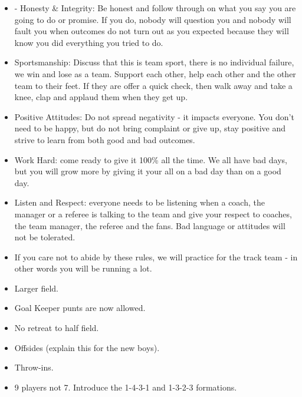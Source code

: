 \documentclass[10pt,letterpaper]{article}
\newenvironment{evenBlock}[1]{%
    \tcolorbox[beamer,%
    noparskip,breakable,
    colback=LightGreen,colframe=DarkGreen,%
    colbacklower=LimeGreen!75!LightGreen,%
    title=#1]}%
    {\endtcolorbox}
\newenvironment{oddBlock}[1]{%
    \tcolorbox[beamer,%
    noparskip,breakable,
    colback=LightBlue,colframe=DarkBlue,%
    colbacklower=DarkBlue!75!LightBlue,%
    title=#1]}%
    {\endtcolorbox}
\begin{document}
\begin{oddBlock}{Expectations}
    \begin{itemize}
        \item - Honesty \& Integrity:  Be honest and follow through on what you say you are going to do or promise.  If you do, nobody will question you and nobody will fault you when outcomes do not turn out as you expected because they will know you did everything you tried to do.
        \item Sportsmanship:  Discuss that this is team sport, there is no individual failure, we win and lose as a team.  Support each other, help each other and the other team to their feet.  If they are offer a quick check, then walk away and take a knee, clap and applaud them when they get up.
        \item Positive Attitudes: Do not spread negativity - it impacts everyone.  You don't need to be happy, but do not bring complaint or give up, stay positive and strive to learn from both good and bad outcomes.
        \item Work Hard: come ready to give it 100\% all the time.  We all have bad days, but you will grow more by giving it your all on a bad day than on a good day.
        \item Listen and Respect: everyone needs to be listening when a coach, the manager or a referee is talking to the team and give your respect to coaches, the team manager, the referee and the fans.  Bad language or attitudes will not be tolerated.
        \item If you care not to abide by these rules, we will practice for the track team - in other words you will be running a lot.
    \end{itemize}
\end{oddBlock}

\begin{evenBlock}{U11 Rules (5 min)}
    \begin{itemize}
        \item Larger field.
        \item Goal Keeper punts are now allowed.
        \item No retreat to half field.
        \item Offsides (explain this for the new boys).
        \item Throw-ins.
        \item 9 players not 7.  Introduce the 1-4-3-1  and 1-3-2-3 formations.
    \end{itemize}
\end{evenBlock}
\end{document}
